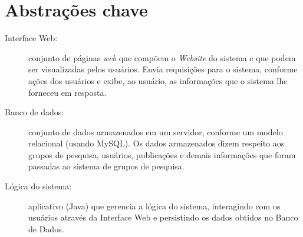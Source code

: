 \documentclass[11pt, a4paper]{article}
\begin{document}
    \section{Abstrações chave}
        \begin{description}
            \item[Interface Web:] conjunto de páginas \emph{web} que compõem o \emph{Website}
            do sistema e que podem ser visualizadas pelos usuários. Envia
            requisições para o sistema, conforme ações dos usuários e
            exibe, ao usuário, as informações que o sistema lhe forneceu em
            resposta.

            \item[Banco de dados:] conjunto de dados armazenados em um servidor, conforme um modelo relacional (usando MySQL). Os dados
            armazenados dizem respeito aos grupos de pesquisa, usuários,
            publicações e demais informações que foram passadas ao sistema de
            grupos de pesquisa.

            \item[Lógica do sistema:] aplicativo (Java) que gerencia a lógica do
            sistema, interagindo com os usuários através da Interface Web e
            persistindo os dados obtidos no Banco de Dados.
        \end{description}
\end{document}
